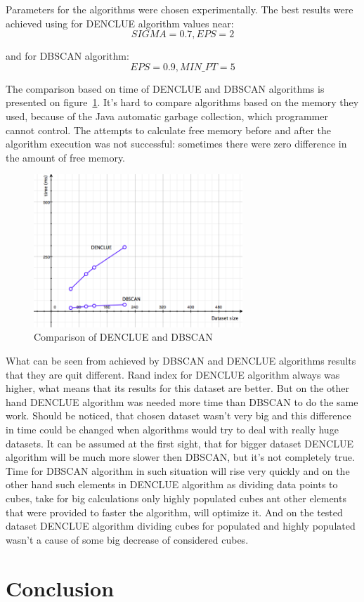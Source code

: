 \documentclass[12pt, a4paper, notitlepage, oneside]{article}
\begin{document}
Parameters for the algorithms were chosen experimentally. The best results were achieved using for DENCLUE  algorithm values near: 
$$SIGMA = 0.7, EPS = 2$$

and for DBSCAN algorithm:
$$EPS = 0.9, MIN\_PT = 5$$


The comparison based on time of DENCLUE and DBSCAN algorithms is presented on figure~\ref{comparison_time}. It's hard to compare algorithms based on the memory they used, because of the Java automatic garbage collection, which programmer cannot control. The attempts to calculate free memory before and after the algorithm execution was not successful: sometimes there were zero difference in the amount of free memory. 

\begin{figure}[!ht]
 	\centering
	\includegraphics[width=0.7\textwidth]{images/comparison_time.png}
 	\caption[]
	{Comparison of DENCLUE and DBSCAN}
		\label{comparison_time}
\end{figure}

What can be seen from achieved by DBSCAN and DENCLUE algorithms results that they are quit different. Rand index for DENCLUE algorithm always was higher, what means that its results for this dataset are better. But on the other hand DENCLUE  algorithm was needed  more time than DBSCAN to do the same work. Should be noticed, that chosen dataset wasn't very big and this difference in time could be changed when algorithms would try to deal with really huge datasets. It can be assumed at the first sight, that for bigger dataset DENCLUE algorithm will be much more slower then DBSCAN, but it's not completely true. Time for DBSCAN algorithm in such situation will rise very quickly and on the other hand such elements in DENCLUE algorithm as dividing data points to cubes, take for big calculations only highly populated cubes ant other elements that were provided to faster the algorithm, will optimize it. And on the tested dataset DENCLUE algorithm dividing cubes for populated and highly populated wasn't a cause of some big decrease of considered cubes. 


\cleardoublepage


\section*{Conclusion}





\newpage



\end{document}

